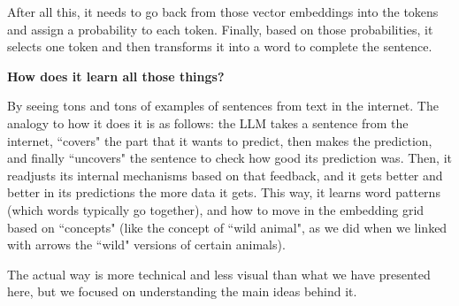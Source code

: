 \documentclass[12pt]{article}
\begin{document}
After all this, it needs to go back from those vector embeddings into the tokens and assign a probability to each token. Finally, based on those probabilities, it selects one token and then transforms it into a word to complete the sentence.

\vspace{0.5cm}
\textbf{\large How does it learn all those things?}

By seeing tons and tons of examples of sentences from text in the internet. The analogy to how it does it is as follows: the LLM takes a sentence from the internet, ``covers" the part that it wants to predict, then makes the prediction, and finally ``uncovers" the sentence to check how good its prediction was. Then, it readjusts its internal mechanisms based on that feedback, and it gets better and better in its predictions the more data it gets. This way, it learns word patterns (which words typically go together), and how to move in the embedding grid based on ``concepts" (like the concept of ``wild animal", as we did when we linked with arrows the ``wild" versions of certain animals).

The actual way is more technical and less visual than what we have presented here, but we focused on understanding the main ideas behind it.
\end{document}
